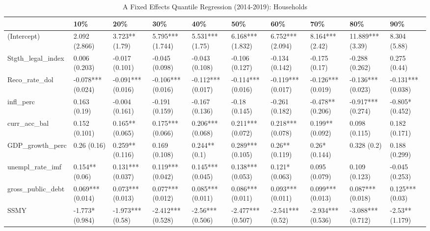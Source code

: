 \begin{table}[ht]
\centering
\caption{A Fixed Effects Quantile Regression (2014-2019): Households} 
\begingroup\small
\begin{tabular}{llllllllll}
  \toprule
 & 10\% & 20\% & 30\% & 40\% & 50\% & 60\% & 70\% & 80\% & 90\% \\ 
  \midrule
(Intercept) & 2.092 (2.866) & 3.723** (1.79) & 5.795*** (1.744) & 5.531*** (1.75) & 6.168*** (1.832) & 6.752*** (2.094) & 8.164*** (2.42) & 11.889*** (3.39) & 8.304 (5.88) \\ 
  Stgth\_legal\_index & 0.006 (0.203) & -0.017 (0.101) & -0.045 (0.098) & -0.043 (0.108) & -0.106 (0.127) & -0.134 (0.142) & -0.175 (0.17) & -0.288 (0.262) & 0.275 (0.44) \\ 
  Reco\_rate\_dol & -0.078*** (0.024) & -0.091*** (0.016) & -0.106*** (0.016) & -0.112*** (0.017) & -0.114*** (0.016) & -0.119*** (0.017) & -0.126*** (0.019) & -0.136*** (0.023) & -0.131*** (0.038) \\ 
  infl\_perc & 0.163 (0.19) & -0.004 (0.161) & -0.191 (0.159) & -0.167 (0.136) & -0.18 (0.145) & -0.261 (0.182) & -0.478** (0.206) & -0.917*** (0.274) & -0.805* (0.452) \\ 
  curr\_acc\_bal & 0.152 (0.101) & 0.165** (0.065) & 0.175*** (0.066) & 0.206*** (0.068) & 0.211*** (0.072) & 0.218*** (0.078) & 0.199** (0.092) & 0.098 (0.115) & 0.182 (0.171) \\ 
  GDP\_growth\_perc & 0.26 (0.16) & 0.259** (0.116) & 0.169 (0.108) & 0.244** (0.1) & 0.289*** (0.105) & 0.26** (0.119) & 0.26* (0.144) & 0.328 (0.2) & 0.188 (0.299) \\ 
  unempl\_rate\_imf & 0.154** (0.06) & 0.131*** (0.037) & 0.119*** (0.042) & 0.145*** (0.045) & 0.138*** (0.053) & 0.121* (0.063) & 0.095 (0.079) & 0.109 (0.123) & -0.045 (0.253) \\ 
  gross\_public\_debt & 0.069*** (0.014) & 0.073*** (0.013) & 0.077*** (0.012) & 0.085*** (0.011) & 0.086*** (0.011) & 0.093*** (0.011) & 0.099*** (0.013) & 0.087*** (0.018) & 0.125*** (0.03) \\ 
  SSMY & -1.773* (0.984) & -1.973*** (0.58) & -2.412*** (0.528) & -2.56*** (0.506) & -2.477*** (0.507) & -2.541*** (0.52) & -2.934*** (0.536) & -3.088*** (0.712) & -2.53** (1.179) \\ 
   \bottomrule
\end{tabular}
\endgroup
\end{table}
